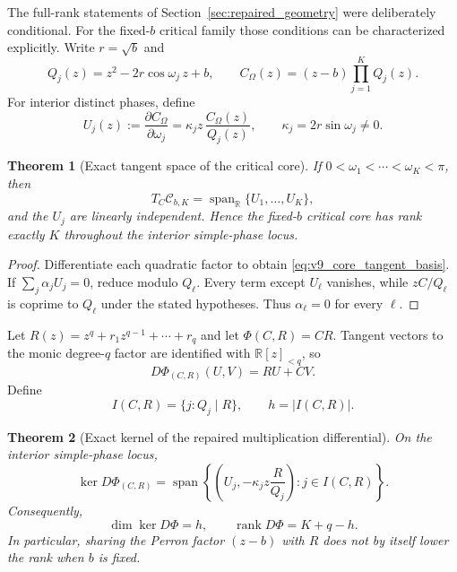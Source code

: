 \documentclass[11pt]{amsart}
\numberwithin{equation}{section}
\theoremstyle{plain}
\newtheorem{theorem}{Theorem}[section]
\theoremstyle{definition}
\theoremstyle{remark}
\begin{document}
The full-rank statements of Section~\ref{sec:repaired_geometry} were deliberately conditional.
For the fixed-$b$ critical family those conditions can be characterized explicitly.
Write $r=\sqrt b$ and
\[
Q_j(z)=z^2-2r\cos\omega_j\,z+b,
\qquad
C_\Omega(z)=(z-b)\prod_{j=1}^KQ_j(z).
\]
For interior distinct phases, define
\begin{equation}
U_j(z):=\frac{\partial C_\Omega}{\partial\omega_j}
=\kappa_j z\,\frac{C_\Omega(z)}{Q_j(z)},
\qquad
\kappa_j=2r\sin\omega_j\neq0.
\label{eq:v9_core_tangent_basis}
\end{equation}

\begin{theorem}[Exact tangent space of the critical core]
\label{thm:v9_exact_core_tangent}
If $0<\omega_1<\cdots<\omega_K<\pi$, then
\[
T_C\mathcal C_{b,K}=\operatorname{span}_{\mathbb R}\{U_1,\ldots,U_K\},
\]
and the $U_j$ are linearly independent.  Hence the fixed-$b$ critical core has rank exactly $K$
throughout the interior simple-phase locus.
\end{theorem}

\begin{proof}
Differentiate each quadratic factor to obtain \eqref{eq:v9_core_tangent_basis}.  If
$\sum_j\alpha_jU_j=0$, reduce modulo $Q_\ell$.  Every term except $U_\ell$ vanishes, while
$zC/Q_\ell$ is coprime to $Q_\ell$ under the stated hypotheses.  Thus $\alpha_\ell=0$ for every
$\ell$.
\end{proof}

Let $R(z)=z^q+r_1z^{q-1}+\cdots+r_q$ and let
$\Phi(C,R)=CR$.  Tangent vectors to the monic degree-$q$ factor are identified with
$\mathbb R[z]_{<q}$, so
\begin{equation}
D\Phi_{(C,R)}(U,V)=RU+CV.
\label{eq:v9_DPhi}
\end{equation}
Define
\[
I(C,R)=\{j:Q_j\mid R\},
\qquad
h=|I(C,R)|.
\]

\begin{theorem}[Exact kernel of the repaired multiplication differential]
\label{thm:v9_kernel_DPhi}
On the interior simple-phase locus,
\begin{equation}
\ker D\Phi_{(C,R)}
=
\operatorname{span}
\left\{
\left(U_j,-\kappa_jz\frac{R}{Q_j}\right):
 j\in I(C,R)
\right\}.
\label{eq:v9_kernel_DPhi}
\end{equation}
Consequently,
\begin{equation}
\boxed{\dim\ker D\Phi=h,\qquad
\operatorname{rank}D\Phi=K+q-h.}
\label{eq:v9_rank_DPhi}
\end{equation}
In particular, sharing the Perron factor $(z-b)$ with $R$ does not by itself lower the rank when
$b$ is fixed.
\end{theorem}
\end{document}
